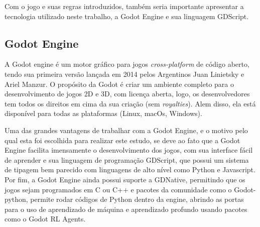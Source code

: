     Com o jogo e suas regras introduzidos, também seria importante apresentar a 
    tecnologia utilizado neste trabalho, a Godot Engine e sua linguagem GDScript.

\subsection{Godot Engine}

    A Godot engine\cite{GodotEngine} é um motor gráfico para jogos \textit{cross-platform} de 
    código aberto, tendo sua primeira versão lançada em 2014 pelos Argentinos 
    Juan Linietsky e Ariel Manzur. O propósito da Godot é criar um ambiente 
    completo para o desenvolvimento de jogos 2D e 3D, com licença aberta, logo, 
    os desenvolvedores tem todos os direitos em cima da sua criação (sem \textit{royalties}). 
    Alem disso, ela está disponível para todas as plataformas (Linux, macOs, Windows).

    Uma das grandes vantagens de trabalhar com a Godot Engine, e o motivo pelo qual esta
    foi escolhida para realizar este estudo, se deve ao fato que a Godot Engine facilita imensamente 
    o desenvolvimento dos jogos, com sua interface fácil de aprender e sua linguagem de programação
    GDScript, que possui um sistema de tipagem bem parecido com linguagens de alto nível 
    como Python e Javascript. Por fim, a Godot Engine ainda possui suporte a GDNative, permitindo 
    que os jogos sejam programados em C ou C++ e pacotes da comunidade como o Godot-python\cite{GodotPython}, permite 
    rodar códigos de Python dentro da engine, abrindo as portas para o uso de aprendizado de máquina e 
    aprendizado profundo usando pacotes como o Godot RL Agents\cite{beeching2021godotrlagents}.


    